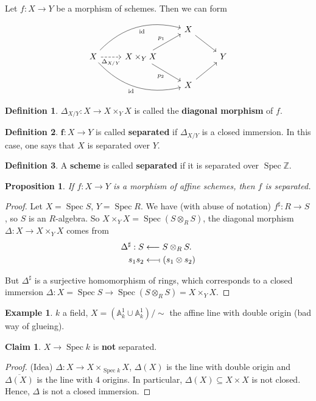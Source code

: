\documentclass[12pt]{article}
\DeclareMathOperator{\id}{id}
\DeclareMathOperator{\Spec}{Spec}
\newtheorem*{proposition}{Proposition}
\theoremstyle{definition}
\newtheorem*{definition}{Definition}
\newtheorem*{claim}{Claim}
\newtheorem*{example}{Example}
\begin{document}
Let $f:X\rightarrow Y$ be a morphism of schemes. Then we can form
\[
\begin{tikzcd}
&&X\arrow[rd]\\
X\arrow[r,"\Delta_{X/Y}",dashed,swap]\arrow[rru,"\id",swap,bend left]\arrow[rrd,"\id",swap,bend right]&X\times_YX\arrow[ru,"p_1"]\arrow[rd,"p_2",swap]&&Y\\
&&X\arrow[ru]
\end{tikzcd}
\]

\begin{definition}
$\Delta_{X/Y}:X\rightarrow X\times_YX$ is called the \textbf{diagonal morphism} of $f$.
\end{definition}

\begin{definition}
$\boldsymbol{f}:X\rightarrow Y$ is called \textbf{separated} if $\Delta_{X/Y}$ is a closed immersion. In this case, one says that $X$ is separated over $Y$.
\end{definition}

\begin{definition}
A \textbf{scheme} is called \textbf{separated} if it is separated over $\Spec\mathbb{Z}$.
\end{definition}

\begin{proposition}
If $f:X\rightarrow Y$ is a morphism of affine schemes, then $f$ is separated.
\end{proposition}

\begin{proof}
Let $X=\Spec S$, $Y=\Spec R$. We have (with abuse of notation) $f^{\sharp}:R\rightarrow S$, so $S$ is an $R$-algebra. So $X\times_YX=\Spec(S\otimes_RS)$, the diagonal morphism $\Delta:X\rightarrow X\times_YX$ comes from
\begin{align*}
\Delta^{\sharp}:S&\longleftarrow S\otimes_RS.\\
s_1s_2&\longleftarrow\!\shortmid(s_1\otimes s_2)
\end{align*}

But $\Delta^{\sharp}$ is a surjective homomorphism of rings, which corresponds to a closed immersion $\Delta:X=\Spec S\rightarrow\Spec(S\otimes_RS)=X\times_YX$.
\end{proof}

\begin{example}
$k$ a field, $X=(\mathbb{A}_k^1\cup\mathbb{A}_k^1)/\sim$ the affine line with double origin (bad way of glueing).

\begin{claim}
$X\rightarrow\Spec k$ is \textbf{not} separated.
\end{claim}

\begin{proof}
(Idea) $\Delta:X\rightarrow X\times_{\Spec k}X$, $\Delta(X)$ is the line with double origin and $\overline{\Delta(X)}$ is the line with 4 origins. In particular, $\Delta(X)\subseteq X\times X$ is not closed. Hence, $\Delta$ is not a closed immersion.
\end{proof}
\end{example}
\end{document}
